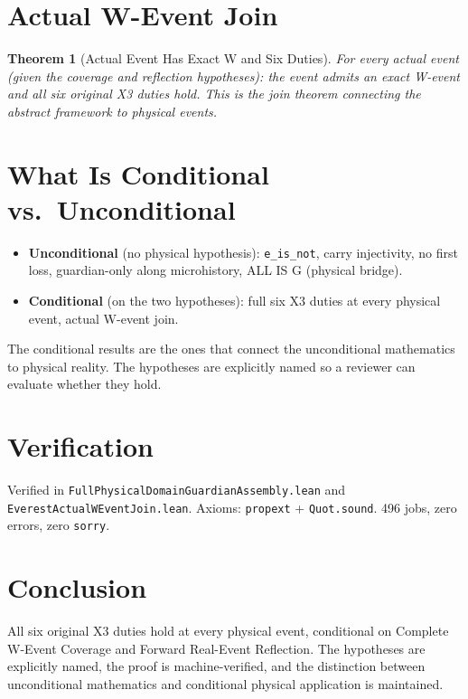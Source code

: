 \documentclass[12pt,a4paper]{article}
\newtheorem{theorem}{Theorem}[section]
\begin{document}
\section{Actual W-Event Join}

\begin{theorem}[Actual Event Has Exact W and Six Duties]\label{thm:actual}
For every actual event (given the coverage and reflection hypotheses):
the event admits an exact W-event and all six original X3 duties hold.
This is the join theorem connecting the abstract framework to physical
events.
\end{theorem}

\section{What Is Conditional vs.\ Unconditional}

\begin{itemize}
    \item \textbf{Unconditional} (no physical hypothesis): \texttt{e\_is\_not},
    carry injectivity, no first loss, guardian-only along microhistory,
    ALL IS G (physical bridge).
    \item \textbf{Conditional} (on the two hypotheses): full six X3 duties
    at every physical event, actual W-event join.
\end{itemize}

The conditional results are the ones that connect the unconditional
mathematics to physical reality. The hypotheses are explicitly named
so a reviewer can evaluate whether they hold.

\section{Verification}

Verified in \texttt{FullPhysicalDomainGuardianAssembly.lean} and
\texttt{EverestActualWEventJoin.lean}. Axioms: \texttt{propext} +
\texttt{Quot.sound}. 496 jobs, zero errors, zero \texttt{sorry}.

\section{Conclusion}

All six original X3 duties hold at every physical event, conditional on
Complete W-Event Coverage and Forward Real-Event Reflection. The
hypotheses are explicitly named, the proof is machine-verified, and the
distinction between unconditional mathematics and conditional physical
application is maintained.
\end{document}
